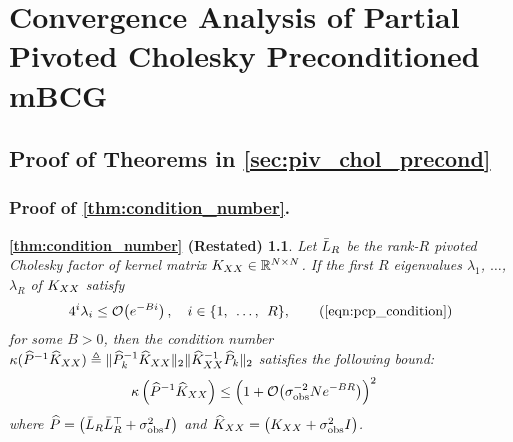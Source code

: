 \chapter{Convergence Analysis of Partial Pivoted Cholesky Preconditioned mBCG}
\label{app:theory}

\section{Proof of Theorems in \cref{sec:piv_chol_precond}}


\subsection{Proof of \cref{thm:condition_number}.}
\newtheorem*{thm:condition_number}{\cref{thm:condition_number} (Restated)}
\begin{thm:condition_number}
  Let $\bar{L}_{R}$ be the rank-$R$ pivoted Cholesky factor of kernel matrix $K_{XX} \in \mathbb{R}^{N \times N}$.
  If the first $R$ eigenvalues $\lambda_1$, $\ldots$, $\lambda_R$ of $K_{XX}$ satisfy
	\begin{equation*}
		4^{i}\lambda_{i} \leq \bigo{e^{-Bi}}, \quad i \in \{ 1, \:\: \ldots, \:\: R \},
		\tag{\ref{eqn:pcp_condition}}
	\end{equation*}
	for some $B>0$, then the condition number $\kappa(\widehat{P}^{-1}\widehat{K}_{XX}) \triangleq \Vert \widehat{P}_{k}^{-1}\widehat{K}_{XX} \Vert_{2} \Vert \widehat{K}_{XX}^{-1}\widehat{P}_{k} \Vert_{2}$
	satisfies the following bound:
  \begin{align}
    \kappa \left( \trainP^{-1}\trainK \right)
    &\leq \Bigl( 1 + \bigo{\sigma^{-2}_\text{obs} N e^{-BR}} \Bigr)^2
		\nonumber
  \end{align}
	where $\widehat{P} = \left( \bar{L}_R \bar{L}_R^\top + \sigma^2_\text{obs} I \right)$ and $\widehat{K}_{XX} = \left( K_{XX} + \sigma^2_\text{obs} I \right)$.
\end{thm:condition_number}


